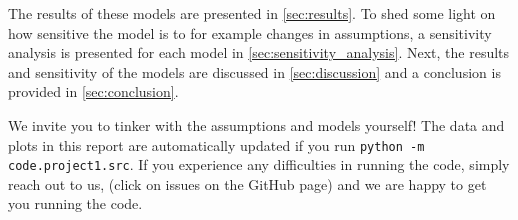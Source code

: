 The results of these models are presented in \cref{sec:results}. To shed some light on how sensitive the model is to for example changes in assumptions, a sensitivity analysis is presented for each model in \cref{sec:sensitivity_analysis}. Next, the results and sensitivity of the models are discussed in \cref{sec:discussion} and a conclusion is provided in \cref{sec:conclusion}.

We invite you to tinker with the assumptions and models yourself! The data and plots in this report are automatically updated if you run \verb+python -m code.project1.src+. If you experience any difficulties in running the code, simply reach out to us, (click on issues on the GitHub page) and we are happy to get you running the code.
